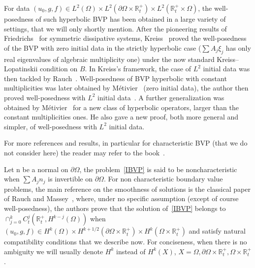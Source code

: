 \documentclass[10pt]{amsart}
\theoremstyle{definition}\newtheorem{defi}[theo]{Definition}\newtheorem{rema}[theo]{Remark}\newtheorem{exam}[theo]{Example}\newtheorem{exem}[theo]{Example}\newtheorem{nota}[theo]{Notation}
\newcommand{\R}{\mathbb{R}}
\newcommand{\rmn}{\mathrm{n}}
\begin{document}
For data $(u_0,g,f)\in L^2(\Omega)\times L^2(\partial\Omega\times \R_t^+)\times L^2(\R^+_t\times \Omega)$, the well-posedness of such hyperbolic BVP has been obtained in a large variety of settings, that we will only shortly mention. After the pioneering results of Friedrichs~\cite{Friedrichs} for symmetric dissipative systems, Kreiss~\cite{Kreiss} proved the well-posedness of the BVP with zero initial data in the strictly hyperbolic case ($\sum A_j\xi_j$ has only real eigenvalues of algebraic multiplicity one) under the now standard Kreiss--Lopatinskii condition on $B$. In Kreiss's framework, the case of $L^2$ initial data was then tackled by Rauch~\cite{Rauch}. Well-posedness of BVP hyperbolic with constant multiplicities was later obtained by Métivier~\cite{Met} (zero initial data), the author then proved well-posedness with $L^2$ initial data~\cite{Audiard1}. A further generalization was obtained by Métivier~\cite{Metsemigroupe} for a new class of hyperbolic operators, larger than the constant multiplicities ones. He also gave a new proof, both more general and simpler, of well-posedness with $L^2$ initial data.


For more references and results, in particular for characteristic BVP (that we do not consider here) the reader may refer to the book~\cite{Benzoni3}.


Let $\rmn$ be a normal on $\partial\Omega$, the problem~\eqref{IBVP} is said to be noncharacteristic when $\sum A_jn_j$ is invertible on $\partial\Omega$. For non characteristic boundary value problems, the main reference on the smoothness of solutions is the classical paper of Rauch and Massey~\cite{RauchMassey}, where, under no specific assumption (except of course well-posedness), the authors prove that the solution of~\eqref{IBVP} belongs to $\cap_{j=0}^k C^j_t(\R^+_t,H^{k-j}(\Omega))$ when $(u_0,g,f)\in H^k(\Omega)\times H^{k+1/2}(\partial\Omega\times\R_t^+)\times H^k(\Omega\times\R_t^+)$ and satisfy natural compatibility conditions that we describe now. For conciseness, when there is no ambiguity we will usually denote $H^k$ instead of $H^k(X)$, $X=\Omega,\partial\Omega\times \R_t^+,\Omega\times \R_t^+$.
\end{document}
